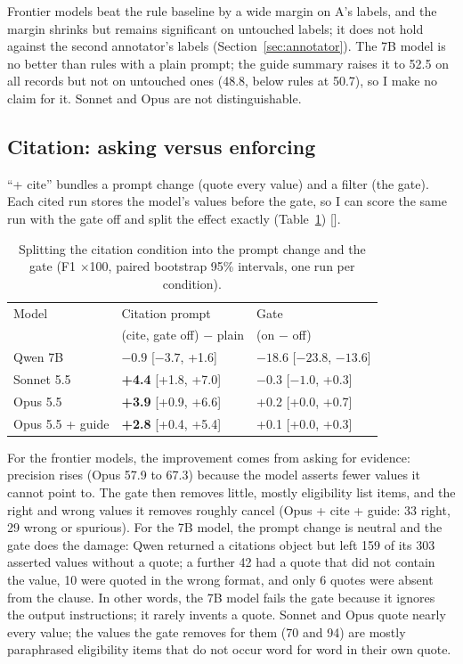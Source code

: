 \documentclass[11pt,a4paper]{article}
\newcommand{\res}[1]{{\small[\path{#1}]}}
\begin{document}
Frontier models beat the rule baseline by a wide margin on A's labels, and the margin shrinks but remains significant on untouched labels; it does not hold against the second annotator's labels (Section~\ref{sec:annotator}). The 7B model is no better than rules with a plain prompt; the guide summary raises it to 52.5 on all records but not on untouched ones (48.8, below rules at 50.7), so I make no claim for it. Sonnet and Opus are not distinguishable.

\subsection{Citation: asking versus enforcing}\label{sec:cite}

``+ cite'' bundles a prompt change (quote every value) and a filter (the gate). Each cited run stores the model's values before the gate, so I can score the same run with the gate off and split the effect exactly (Table~\ref{tab:ablation}) \res{results/v1c_error_analysis_summary_2026-11-02.md}.

\begin{table}[h]
\centering
\begin{tabular}{lll}
\toprule
Model & Citation prompt & Gate \\
 & (cite, gate off) $-$ plain & (on $-$ off) \\
\midrule
Qwen 7B & $-0.9$ [$-3.7$, +1.6] & $\mathbf{-18.6}$ [$-23.8$, $-13.6$] \\
Sonnet 5.5 & \textbf{+4.4} [+1.8, +7.0] & $-0.3$ [$-1.0$, +0.3] \\
Opus 5.5 & \textbf{+3.9} [+0.9, +6.6] & +0.2 [+0.0, +0.7] \\
Opus 5.5 + guide & \textbf{+2.8} [+0.4, +5.4] & +0.1 [+0.0, +0.3] \\
\bottomrule
\end{tabular}
\caption{Splitting the citation condition into the prompt change and the gate (F1 $\times$100, paired bootstrap 95\% intervals, one run per condition).}
\label{tab:ablation}
\end{table}

For the frontier models, the improvement comes from asking for evidence: precision rises (Opus 57.9 to 67.3) because the model asserts fewer values it cannot point to. The gate then removes little, mostly eligibility list items, and the right and wrong values it removes roughly cancel (Opus + cite + guide: 33 right, 29 wrong or spurious). For the 7B model, the prompt change is neutral and the gate does the damage: Qwen returned a citations object but left 159 of its 303 asserted values without a quote; a further 42 had a quote that did not contain the value, 10 were quoted in the wrong format, and only 6 quotes were absent from the clause. In other words, the 7B model fails the gate because it ignores the output instructions; it rarely invents a quote. Sonnet and Opus quote nearly every value; the values the gate removes for them (70 and 94) are mostly paraphrased eligibility items that do not occur word for word in their own quote.
\end{document}
